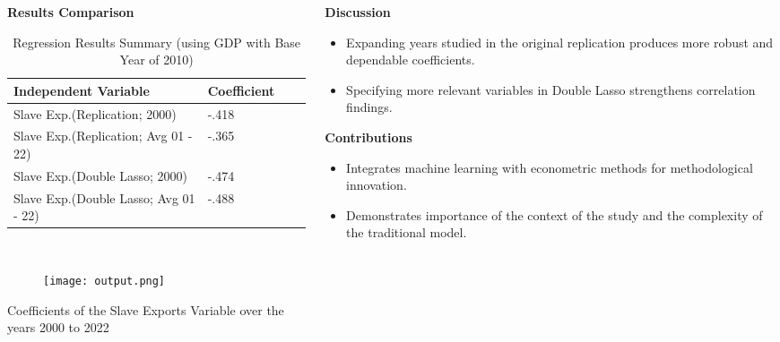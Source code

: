 \documentclass[final]{beamer}
\begin{document}
\begin{frame}[t]
\begin{columns}[T]
\begin{column}{.32\textwidth}
\begin{block}{\Large \textbf{Results Comparison}}
\vspace{0.1cm}
    \begin{table}[H]
\centering
\caption{Regression Results Summary (using GDP with Base Year of 2010)}
\begin{tabular}{llll}
\toprule
Independent Variable & Coefficient \\
\midrule
Slave Exp.(Replication; 2000) & -.418  \\
Slave Exp.(Replication; Avg 01 - 22) & -.365 \\
Slave Exp.(Double Lasso; 2000) & -.474  \\
Slave Exp.(Double Lasso; Avg 01 - 22) & -.488 \\
\hline
\bottomrule
\end{tabular}
\end{table}

\\

\vspace{0.3cm}
\begin{figure}
        \centering
        \texttt{[image: output.png]}
      
    \end{figure}
        \vspace{1cm} 
    \caption{Coefficients of the Slave Exports Variable over the years 2000 to 2022}
    \end{block}

\end{column}

\begin{column}{.32\textwidth}

    \vspace{0.1cm} %

    \begin{block}{\Large \textbf{Discussion}} %
    \Large %
    \begin{itemize}
    \item Expanding years studied in the original replication produces more robust and dependable coefficients.
    \item Specifying more relevant variables in Double Lasso strengthens correlation findings. 
    \end{itemize}
    \end{block}
 \vspace{0.3cm} %
    
    \begin{block}{\Large \textbf{Contributions}} %
    \Large %
    \begin{itemize}
    \item Integrates machine learning with econometric methods for methodological innovation.
    \item Demonstrates importance of the context of the study and the complexity of the traditional model.
    \end{itemize}
    \end{block}



\end{column}
\end{columns}
\end{frame}
\end{document}
